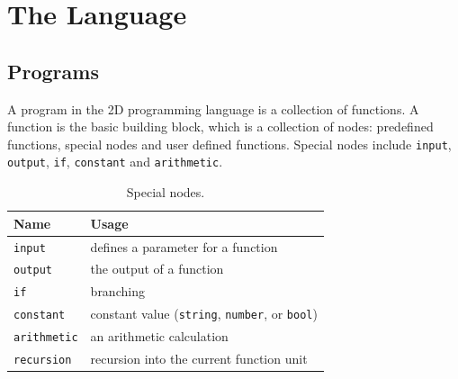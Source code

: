 \documentclass[12pt,UTF8,a4]{article}
\newcommand{\code}[1]{\texttt{#1}}
\newcommand{\type}[1]{\texttt{#1}}
\begin{document}









\section{The Language}
\subsection{Programs}
A program in the 2D programming language is a collection of
functions. A function is the basic building block, which is a
collection of nodes: predefined functions, special nodes and user
defined functions. Special nodes include \code{input}, \code{output},
\code{if}, \code{constant} and \code{arithmetic}.
\begin{table}[!ht]
\center
\begin{tabular}{l|l}
\hline
Name & Usage \\
\hline
\code{input} & defines a parameter for a function \\
\code{output} & the output of a function\\
\code{if} & branching \\
\code{constant} & constant value (\type{string}, \type{number}, or \type{bool}) \\
\code{arithmetic} & an arithmetic calculation \\
\code{recursion} & recursion into the current function unit \\
\hline
\end{tabular}
\caption{Special nodes.}\label{tab:sitems}
\end{table}
\end{document}
